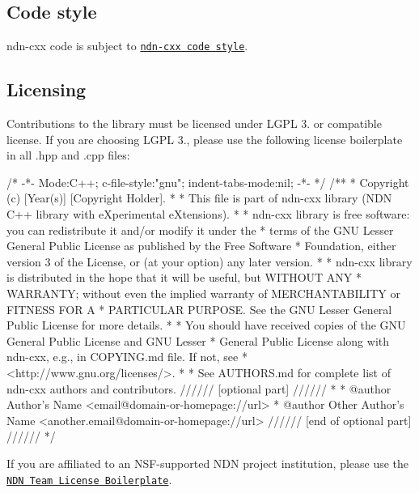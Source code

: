 \subsection*{Code style }

ndn-\/cxx code is subject to \href{http://named-data.net/doc/ndn-cxx/current/code-style.html}{\tt ndn-\/cxx code style}.

\subsection*{Licensing }

Contributions to the library must be licensed under L\+G\+PL 3. or compatible license. If you are choosing L\+G\+PL 3., please use the following license boilerplate in all {\ttfamily .hpp} and {\ttfamily .cpp} files\+:

\begin{DoxyVerb}/* -*- Mode:C++; c-file-style:"gnu"; indent-tabs-mode:nil; -*- */
/**
 * Copyright (c) [Year(s)] [Copyright Holder].
 *
 * This file is part of ndn-cxx library (NDN C++ library with eXperimental eXtensions).
 *
 * ndn-cxx library is free software: you can redistribute it and/or modify it under the
 * terms of the GNU Lesser General Public License as published by the Free Software
 * Foundation, either version 3 of the License, or (at your option) any later version.
 *
 * ndn-cxx library is distributed in the hope that it will be useful, but WITHOUT ANY
 * WARRANTY; without even the implied warranty of MERCHANTABILITY or FITNESS FOR A
 * PARTICULAR PURPOSE.  See the GNU Lesser General Public License for more details.
 *
 * You should have received copies of the GNU General Public License and GNU Lesser
 * General Public License along with ndn-cxx, e.g., in COPYING.md file.  If not, see
 * <http://www.gnu.org/licenses/>.
 *
 * See AUTHORS.md for complete list of ndn-cxx authors and contributors.
 ////// [optional part] //////
 *
 * @author Author's Name <email@domain-or-homepage://url>
 * @author Other Author's Name <another.email@domain-or-homepage://url>
 ////// [end of optional part] //////
 */
\end{DoxyVerb}


If you are affiliated to an N\+S\+F-\/supported N\+DN project institution, please use the \href{http://redmine.named-data.net/projects/ndn-cxx/wiki/NDN_Team_License_Boilerplate_(ndn-cxx)}{\tt N\+DN Team License Boilerplate}. 